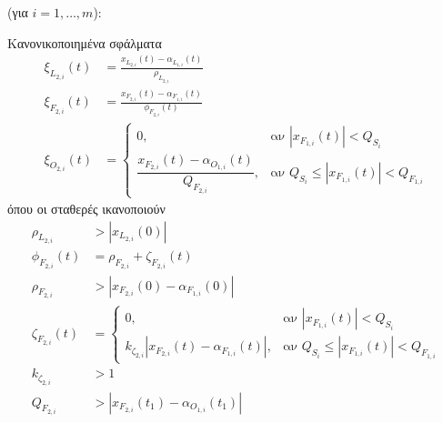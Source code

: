 \bigskip
\begin{step}\label{step:2:control}
(για \( i = 1, \dots, m \)):

\bigskip
Κανονικοποιημένα σφάλματα 
\begin{align}
  \xi_{L_{2,i}}(t) & = \frac{x_{L_{2,i}}(t) - \alpha_{L_{1,i}}(t)}{\rho_{L_{2,i}}} \label{xiL2}    \\[0.3cm]
  \xi_{F_{2,i}}(t) & = \frac{x_{F_{2,i}}(t) - \alpha_{F_{1,i}}(t)}{\phi_{F_{2,i}}(t)} \label{xiF2} \\[0.3cm]
  \xi_{O_{2,i}}(t) & =
  \begin{cases}
    0,                                                         & \text{αν } | x_{F_{1,i}}(t) | < Q_{S_i}                  \\[0.3cm]
    \dfrac{x_{F_{2,i}}(t) - \alpha_{O_{1,i}}(t)}{Q_{F_{2,i}}}, & \text{αν } Q_{S_i} \leq | x_{F_{1,i}}(t) | < Q_{F_{1,i}}
  \end{cases} \label{xiO2}
\end{align}
όπου οι σταθερές ικανοποιούν
\begin{align}
  \rho_{L_{2,i}}     & > \left| x_{L_{2,i}}(0) \right| \label{rhoL2_define}                                                                                                                                                                     \\[0.3cm]
  \phi_{F_{2,i}}(t)  & = \rho_{F_{2,i}} + \zeta_{F_{2,i}}(t) \label{phiF2_define}                                                                                                                                                               \\[0.3cm]
  \rho_{F_{2,i}}     & > \left| x_{F_{2,i}}(0) - \alpha_{F_{1,i}}(0) \right| \label{rhoF2_define}                                                                                                                                               \\[0.3cm]
  \zeta_{F_{2,i}}(t) & =
  \begin{cases}
    0,                                                                   & \text{αν } | x_{F_{1,i}}(t) | < Q_{S_i}                  \\[0.3cm]
    k_{\zeta_{2,i}} \left| x_{F_{2,i}}(t) - \alpha_{F_{1,i}}(t) \right|, & \text{αν } Q_{S_i} \leq | x_{F_{1,i}}(t) | < Q_{F_{1,i}}
  \end{cases} \label{zetaF2_define}\\[0.3cm]
  k_{\zeta_{2,i}}    & > 1 \label{kzeta2}                                                                                                                                                                                                              \\[0.3cm]
  Q_{F_{2,i}}        & > \left| x_{F_{2,i}}(t_1) - \alpha_{O_{1,i}}(t_1) \right| \label{QF2}
\end{align}


\end{step}
